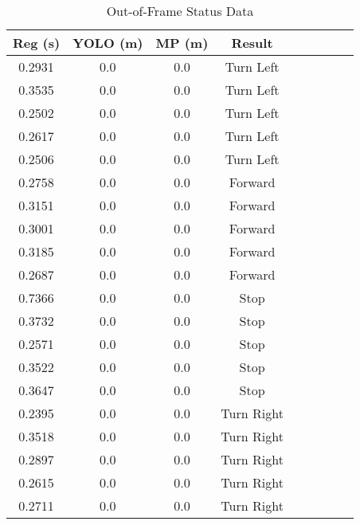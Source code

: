 \begin{table}[H]
    \centering
    \caption{Out-of-Frame Status Data}
    \label{tab:Out-of-Frame_status}
    \begin{tabular}{|c|c|c|c|c|c|c|c|c|}
    \hline
        \cellcolor[HTML]{C0C0C0}Reg (s) & \cellcolor[HTML]{C0C0C0}YOLO (m) & \cellcolor[HTML]{C0C0C0}MP (m) & \cellcolor[HTML]{C0C0C0}Result \\ \hline
        \cellcolor[HTML]{7cFF7c}0.2931 & 0.0 & 0.0 & Turn Left \\ \hline
        \cellcolor[HTML]{7cFF7c}0.3535 & 0.0 & 0.0 & Turn Left \\ \hline
        \cellcolor[HTML]{7cFF7c}0.2502 & 0.0 & 0.0 & Turn Left \\ \hline
        \cellcolor[HTML]{7cFF7c}0.2617 & 0.0 & 0.0 & Turn Left \\ \hline
        \cellcolor[HTML]{7cFF7c}0.2506 & 0.0 & 0.0 & Turn Left \\ \hline
        \cellcolor[HTML]{7cFF7c}0.2758 & 0.0 & 0.0 & Forward \\ \hline
        \cellcolor[HTML]{7cFF7c}0.3151 & 0.0 & 0.0 & Forward \\ \hline
        \cellcolor[HTML]{7cFF7c}0.3001 & 0.0 & 0.0 & Forward \\ \hline
        \cellcolor[HTML]{7cFF7c}0.3185 & 0.0 & 0.0 & Forward \\ \hline
        \cellcolor[HTML]{7cFF7c}0.2687 & 0.0 & 0.0 & Forward \\ \hline
        \cellcolor[HTML]{7cFF7c}0.7366 & 0.0 & 0.0 & Stop \\ \hline
        \cellcolor[HTML]{7cFF7c}0.3732 & 0.0 & 0.0 & Stop \\ \hline
        \cellcolor[HTML]{7cFF7c}0.2571 & 0.0 & 0.0 & Stop \\ \hline
        \cellcolor[HTML]{7cFF7c}0.3522 & 0.0 & 0.0 & Stop \\ \hline
        \cellcolor[HTML]{7cFF7c}0.3647 & 0.0 & 0.0 & Stop \\ \hline
        \cellcolor[HTML]{7cFF7c}0.2395 & 0.0 & 0.0 & Turn Right \\ \hline
        \cellcolor[HTML]{7cFF7c}0.3518 & 0.0 & 0.0 & Turn Right \\ \hline
        \cellcolor[HTML]{7cFF7c}0.2897 & 0.0 & 0.0 & Turn Right \\ \hline
        \cellcolor[HTML]{7cFF7c}0.2615 & 0.0 & 0.0 & Turn Right \\ \hline
        \cellcolor[HTML]{7cFF7c}0.2711 & 0.0 & 0.0 & Turn Right \\ \hline
    \end{tabular}
\end{table}

